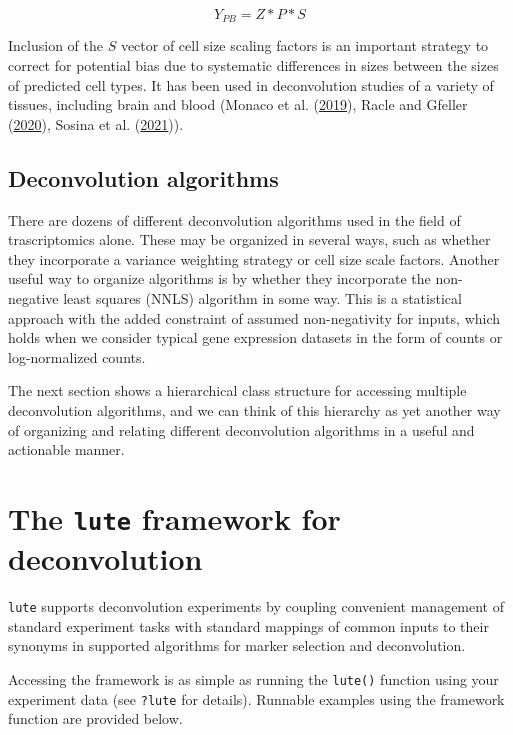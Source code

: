 \documentclass[]{article}
\begin{document}
\[Y_{PB}=Z * P * S\]

Inclusion of the \(S\) vector of cell size scaling factors is an important
strategy to correct for potential bias due to systematic differences in sizes
between the sizes of predicted cell types. It has been used in deconvolution
studies of a variety of tissues, including brain and blood
(Monaco et al. (\protect\hyperlink{ref-monaco_rna-seq_2019}{2019}), Racle and Gfeller (\protect\hyperlink{ref-racle_epic_2020}{2020}), Sosina et al. (\protect\hyperlink{ref-sosina_strategies_2021}{2021})).

\hypertarget{deconvolution-algorithms}{%
\subsection{Deconvolution algorithms}\label{deconvolution-algorithms}}

There are dozens of different deconvolution algorithms used in the field of
trascriptomics alone. These may be organized in several ways, such as whether
they incorporate a variance weighting strategy or cell size scale factors.
Another useful way to organize algorithms is by whether they incorporate the
non-negative least squares (NNLS) algorithm in some way. This is a statistical
approach with the added constraint of assumed non-negativity for inputs, which
holds when we consider typical gene expression datasets in the form of counts
or log-normalized counts.

The next section shows a hierarchical class structure for accessing multiple
deconvolution algorithms, and we can think of this hierarchy as yet another
way of organizing and relating different deconvolution algorithms in a useful
and actionable manner.

\hypertarget{the-lute-framework-for-deconvolution}{%
\section{\texorpdfstring{The \texttt{lute} framework for deconvolution}{The lute framework for deconvolution}}\label{the-lute-framework-for-deconvolution}}

\texttt{lute} supports deconvolution experiments by coupling convenient management of
standard experiment tasks with standard mappings of common inputs to their
synonyms in supported algorithms for marker selection and deconvolution.

Accessing the framework is as simple as running the \texttt{lute()} function using
your experiment data (see \texttt{?lute} for details). Runnable examples using the
framework function are provided below.
\end{document}
